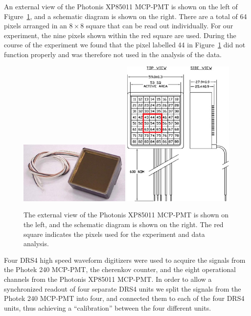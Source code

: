 \documentclass[12pt]{article}
\begin{document}
An external view
of the Photonis XP85011 MCP-PMT is shown on the left of Figure~\ref{fig:photonis},
and a schematic diagram is shown on the right. There are a total of 64 pixels
arranged in an $8\times8$ square that can be read out individually. For our
experiment, the nine pixels shown within the red square are used. During the
course of the experiment we found that the pixel labelled 44 in
Figure~\ref{fig:photonis} did not function properly and was therefore not used
in the analysis of the data. 

\begin{figure}[htbp] 
\centering
\includegraphics[width=0.49\textwidth]{Images/photonis/photonis.jpg}
\includegraphics[width=0.49\textwidth]{Images/photonis/photonis2.png}
\caption{The external view of the Photonis XP85011 MCP-PMT is shown on the left, and
the schematic diagram is shown on the right. The red square indicates the pixels
used for the experiment and data analysis.} 
\label{fig:photonis} 
\end{figure}

Four DRS4 high speed waveform digitizers were used to acquire the signals from
the Photek 240 MCP-PMT, the cherenkov counter, and the eight operational
channels from the Photonis XP85011 MCP-PMT. In order to allow a synchronized
readout of four separate DRS4 units we split the signals from the Photek 240
MCP-PMT into four, and connected them to each of the four DRS4 units, thus achieving
a ``calibration'' between the four different units.  
\end{document}
